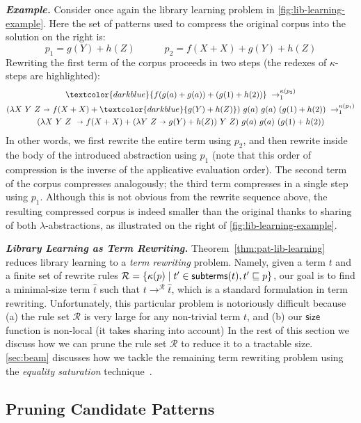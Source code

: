 \documentclass[acmsmall,screen,nonacm,review=false,timestamp=false]{acmart}
\newcommand{\emphbf}[1]{\emph{\textbf{#1}\xspace}}
\newcommand{\mypara}[1]{\smallskip\noindent\emphbf{#1.}\xspace}
\newcommand{\sz}{\mathsf{size}}
\newcommand{\sub}{\sqsubseteq}
\newcommand{\bnd}{\ \mathbf{\shortrightarrow}\ }
\newcommand{\rwsteps}[1]{\rightarrow^{#1}_1}
\newcommand{\rewrites}[1]{\rightarrow^{#1}}
\newcommand{\ruleset}{\mathcal{R}}
\begin{document}
\mypara{Example}
Consider once again the library learning problem in \autoref{fig:lib-learning-example}.
Here the set of patterns used to compress the original corpus into the solution on the right is:
\[
  p_1 = g(Y) + h(Z)\quad\quad\quad
  p_2 = f(X + X) + g(Y) + h(Z)
\]
Rewriting the first term of the corpus proceeds in two steps (the redexes of $\kappa$-steps are highlighted):
\begin{multline*}
  \textcolor{darkblue}{f(g(a) + g(a)) + (g(1) + h(2))}    \;\rwsteps{\kappa(p_2)}\\     
  (\lambda X\ Y\ Z \bnd f(X + X) + \textcolor{darkblue}{g(Y) + h(Z)})\ g(a)\ g(a)\ (g(1) + h(2))\;\rwsteps{\kappa(p_1)}\\ 
  (\lambda X\ Y\ Z\ \bnd f(X + X) + (\lambda Y\ Z \bnd g(Y) + h(Z))\ Y\ Z)\ g(a)\ g(a)\ (g(1) + h(2))
\end{multline*}
In other words, we first rewrite the entire term using $p_2$,
and then rewrite inside the body of the introduced abstraction using $p_1$
(note that this order of compression is the inverse of the applicative evaluation order).
The second term of the corpus compresses analogously;
the third term compresses in a single step using $p_1$.
Although this is not obvious from the rewrite sequence above,
the resulting compressed corpus is indeed smaller than the original
thanks to sharing of both $\lambda$-abstractions,
as illustrated on the right of \autoref{fig:lib-learning-example}.

\mypara{Library Learning as Term Rewriting}
Theorem~\ref{thm:pat-lib-learning} reduces library learning to a \emph{term rewriting} problem.
Namely, given a term $t$ and a finite set of rewrite rules $\ruleset = \{\kappa(p) \mid  t' \in \subterms(t) , t' \sub p\}$,
our goal is to find a minimal-size term $\hat{t}$ such that $t \rewrites{\ruleset} \hat{t}$,
which is a standard formulation in term rewriting.
Unfortunately, this particular problem is notoriously difficult because
(a) the rule set $\ruleset$ is very large for any non-trivial term $t$, and
(b) our $\sz$ function is non-local (it takes sharing into account)
In the rest of this section we discuss how we can prune the rule set $\ruleset$ 
to reduce it to a tractable size.
\autoref{sec:beam} discusses how we tackle the remaining term rewriting problem
using the \emph{equality saturation} technique~\cite{tate2009equality,willsey2021egg}.


\subsection{Pruning Candidate Patterns}
\label{sec:pruning}
\end{document}
